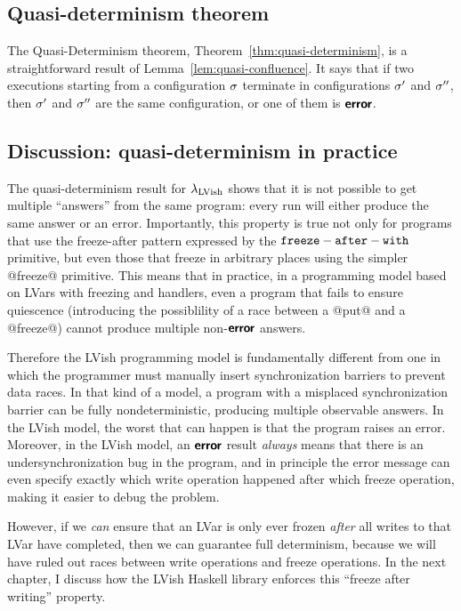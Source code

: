 \LemQuasiConfluence
 
\subsection{Quasi-determinism theorem}\label{subsection:quasi-quasi-determinism}

The Quasi-Determinism theorem, Theorem~\ref{thm:quasi-determinism}, is
a straightforward result of Lemma~\ref{lem:quasi-confluence}.  It says
that if two executions starting from a configuration $\sigma$ terminate
in configurations $\sigma'$ and $\sigma''$, then $\sigma'$ and $\sigma''$
are the same configuration, or one of them is $\textbf{\textsf{error}}$.

\ThmQuasiDeterminism

\subsection{Discussion: quasi-determinism in practice}


The quasi-determinism result for $\lambda_{\textrm{LVish}}$ shows that it is not
possible to get multiple ``answers'' from the same program: every run
will either produce the same answer or an error.  Importantly, this
property is true not only for programs that use the freeze-after
pattern expressed by the ${\mbox{\texttt{freeze}}-\mbox{\texttt{after}}-\mbox{\texttt{with}}}$ primitive, but even those that freeze
in arbitrary places using the simpler @freeze@ primitive.  This means
that in practice, in a programming model based on LVars with freezing
and handlers, even a program that fails to ensure quiescence
(introducing the possiblility of a race between a @put@ and a
@freeze@) cannot produce multiple non-$\textbf{\textsf{error}}$ answers.

Therefore the LVish programming model is fundamentally different from
one in which the programmer must manually insert synchronization
barriers to prevent data races.  In that kind of a model, a program
with a misplaced synchronization barrier can be fully
nondeterministic, producing multiple observable answers.  In the LVish
model, the worst that can happen is that the program raises an error.
Moreover, in the LVish model, an $\textbf{\textsf{error}}$ result \emph{always} means
that there is an undersynchronization bug in the program, and in
principle the error message can even specify exactly which write
operation happened after which freeze operation, making it easier to
debug the problem.

However, if we \emph{can} ensure that an LVar is only ever frozen
\emph{after} all writes to that LVar have completed, then we can
guarantee full determinism, because we will have ruled out races
between write operations and freeze operations.  In the next chapter,
I discuss how the LVish Haskell library enforces this ``freeze after
writing'' property.
